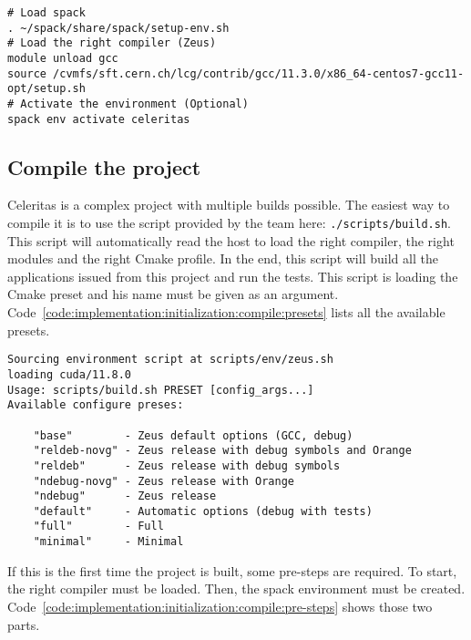 \begin{code}
    \label{code:implementation:initialization:environment:celeritas:create}
    \begin{verbatim}
# Load spack
. ~/spack/share/spack/setup-env.sh
# Load the right compiler (Zeus)
module unload gcc
source /cvmfs/sft.cern.ch/lcg/contrib/gcc/11.3.0/x86_64-centos7-gcc11-opt/setup.sh
# Activate the environment (Optional)
spack env activate celeritas
    \end{verbatim}
\end{code}


\subsection{Compile the project}
\label{ch:implementation:initialization:compile}

Celeritas is a complex project with multiple builds possible.
The easiest way to compile it is to use the script provided by the team here:
\texttt{./scripts/build.sh}.
This script will automatically read the host to load the right compiler, the
right modules and the right Cmake profile.
In the end, this script will build all the applications issued from this project
and run the tests.
This script is loading the Cmake preset and his name must be given as an
argument.
Code~\ref{code:implementation:initialization:compile:presets} lists all the
available presets.

\begin{code}
    \label{code:implementation:initialization:compile:presets}
    \begin{verbatim}
Sourcing environment script at scripts/env/zeus.sh
loading cuda/11.8.0
Usage: scripts/build.sh PRESET [config_args...]
Available configure preses:

    "base"        - Zeus default options (GCC, debug)
    "reldeb-novg" - Zeus release with debug symbols and Orange
    "reldeb"      - Zeus release with debug symbols
    "ndebug-novg" - Zeus release with Orange
    "ndebug"      - Zeus release
    "default"     - Automatic options (debug with tests)
    "full"        - Full
    "minimal"     - Minimal
    \end{verbatim}
\end{code}

If this is the first time the project is built, some pre-steps are required.
To start, the right compiler must be loaded.
Then, the spack environment must be created.
Code~\ref{code:implementation:initialization:compile:pre-steps} shows those two
parts.

